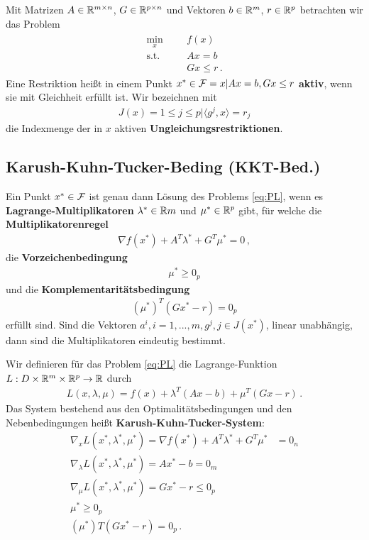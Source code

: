 Mit Matrizen $A \in \mathbb R^{m\times n}$, $G \in \mathbb R^{p\times n}$ und Vektoren $b \in \mathbb R^m$, $r \in \mathbb R^p$ betrachten wir das Problem
	\begin{gather*}
	\label{eq:PL}
  		\tag{PL}
  			\begin{aligned}
    			\min_x
    			& & & f(x) \\
    			\text{s.t.}
    			& & & Ax=b \\
    			& & & Gx \leq r    			\,.
  			\end{aligned}
	\end{gather*}
Eine Restriktion heißt in einem Punkt $x^* \in \mathcal{F} = {x | Ax = b, Gx  \leq r}$ \textbf{aktiv}, wenn sie mit Gleichheit erfüllt ist. Wir bezeichnen mit
\begin{align*}
J(x) = {1  \leq j  \leq p | \langle g^j , x \rangle = r_j}
\end{align*} 	
die Indexmenge der in $x$ aktiven \textbf{Ungleichungsrestriktionen}.

\subsection{Karush-Kuhn-Tucker-Beding (KKT-Bed.)}

Ein Punkt $x^* \in \mathcal{F}$ ist genau dann Lösung des Problems \eqref{eq:PL}, wenn es
\textbf{Lagrange-Multiplikatoren} $\lambda ^* \in \mathbb R m$ und $\mu^* \in \mathbb R^p$ gibt, für welche die
\textbf{Multiplikatorenregel}
\begin{align*}
\nabla f(x^* ) + A^T \lambda^* + G^T \mu^* = 0 \,,
\end{align*}
die \textbf{Vorzeichenbedingung}
\begin{align*}
\mu^* \geq 0_p
\end{align*}
und die \textbf{Komplementaritätsbedingung}
\begin{align*}
(\mu^*)^T (Gx^* - r) = 0_p
\end{align*}
erfüllt sind. Sind die Vektoren $a^i , i = 1, . . . , m, g^j , j \in J(x^*)$, linear unabhängig, dann sind die Multiplikatoren eindeutig bestimmt.

Wir definieren für das Problem \eqref{eq:PL} die Lagrange-Funktion $L : D \times \mathbb R^m \times \mathbb R^p \rightarrow \mathbb R$ durch
\begin{align*}
L(x, \lambda, \mu) = f(x) + \lambda^T(Ax - b) + \mu^T(Gx - r)\,.
\end{align*}
Das System bestehend aus den Optimalitätsbedingungen und den Nebenbedingungen heißt \textbf{Karush-Kuhn-Tucker-System}:
\begin{align*}
\nabla_x L(x^* , \lambda ^* , \mu ^* ) = \nabla f(x^*) + A^T\lambda ^* + G^T \mu ^* &= 0_n \\
\nabla_\lambda L(x^*, \lambda ^*, \mu ^*) = Ax^* - b = 0_m \\
\nabla_\mu L(x^* , \lambda ^* , \mu ^* ) = Gx^* - r  \leq 0_p \\
\mu^* \geq 0_p \\
(\mu^*)T (Gx^* - r) = 0_p\,.
\end{align*}



